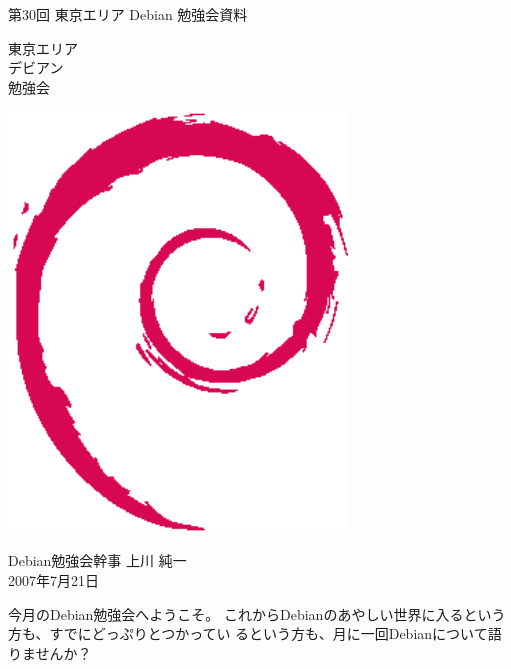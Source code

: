 \documentclass[mingoth,a4paper]{jsarticle}
\newcommand{\debmtgyear}{2007}
\newcommand{\debmtgdate}{21}
\newcommand{\debmtgmonth}{7}
\newcommand{\debmtgnumber}{30}
\begin{document}
\begin{titlepage}


 第\debmtgnumber{}回 東京エリア Debian 勉強会資料

\vspace{2cm}

\begin{minipage}[t]{0.6\hsize}
\vspace{-2cm}
{\fontsize{60}{60}
{\gt
\color{dancerdarkblue}
東京エリア \\
デビアン \\
勉強会
}}
\end{minipage}
\begin{minipage}[b]{0.4\hsize}
\hspace{-1cm}\includegraphics[width=9cm]{image200502/openlogo-nd.eps}
\end{minipage}

\vspace{3cm}
\hfill{}Debian勉強会幹事 上川 純一\\
\hfill{}\debmtgyear{}年\debmtgmonth{}月\debmtgdate{}日

\thispagestyle{empty}
\end{titlepage}



今月のDebian勉強会へようこそ。
 これからDebianのあやしい世界に入るという方も、すでにどっぷりとつかってい
 るという方も、月に一回Debianについて語りませんか？
\end{document}
